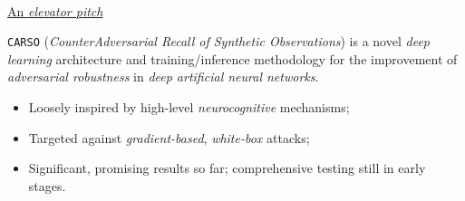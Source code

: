 
\begin{frame}{\mbox{ }}

    \begin{center}
    \underline{An \textit{elevator pitch}}
    \end{center}

    \texttt{CARSO} (\textit{CounterAdversarial Recall of Synthetic Observations}) is a \alert{novel} \textit{deep learning} architecture and training/inference methodology for the improvement of \alert{\textit{adversarial robustness}} in \textit{deep artificial neural networks}.

    \begin{itemize}
        \item Loosely inspired by high-level \textit{neurocognitive} mechanisms;
        \item Targeted against \textit{\alert{gradient}-based}, \textit{white-box} attacks;
        \item Significant, promising results so far; comprehensive testing still in early stages.
    \end{itemize}

\end{frame}